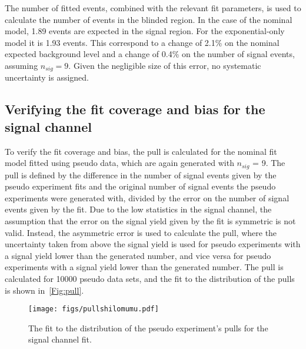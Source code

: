 The number of fitted events, combined with the relevant fit parameters, is used to calculate the number of events in the blinded region. In the case of the nominal model, 1.89 events are expected in the signal region. For the exponential-only model it is 1.93 events. This correspond to a change of 2.1\% on the nominal expected background level and a change of 0.4\% on the number of signal events, assuming $n_{sig} = 9$. Given the negligible size of this error, no systematic uncertainty is assigned. 



\subsection{Verifying the fit coverage and bias for the signal channel}
\label{sec:pull}
To verify the fit coverage and bias, the pull is calculated for the nominal fit model fitted using pseudo data, which are again generated with $n_{sig}$ = 9. The pull is defined by the difference in the number of signal events given by the pseudo experiment fits and the original number of signal events the pseudo experiments were generated with, divided by the error on the number of signal events given by the fit. Due to the low statistics in the signal channel, the assumption that the error on the signal yield given by the fit is symmetric is not valid. Instead, the asymmetric error is used to calculate the pull, where the uncertainty taken from above the signal yield is used for pseudo experiments with a signal yield lower than the generated number, and vice versa for pseudo experiments with a signal yield lower than the generated number. The pull is calculated for 10000 pseudo data sets, and the fit to the distribution of the pulls is shown in~\autoref{Fig:pull}.
\begin{figure}[h!]
  \def\nh{0.7\textwidth}
  \centering
  \texttt{[image: figs/pullshilomumu.pdf]}%
  \caption{The fit to the distribution of the pseudo experiment's pulls for the signal channel fit. }%
  \label{Fig:pull}
\end{figure}


